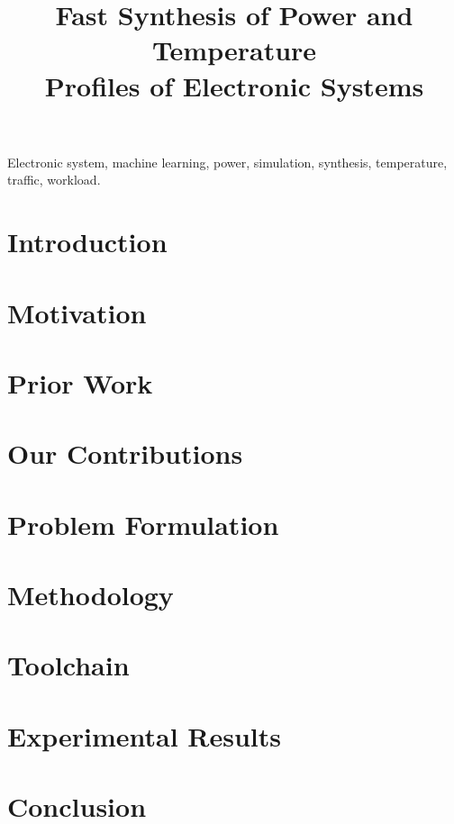 \documentclass[conference]{IEEEtran}
\title{
  Fast Synthesis of Power and Temperature\\
  Profiles of Electronic Systems
  \vspace{-1.5em}
}
\author{}
\begin{document}
  \maketitle

  \begin{abstract}
    
  \end{abstract}

  \begin{IEEEkeywords}
    Electronic system,
    machine learning,
    power,
    simulation,
    synthesis,
    temperature,
    traffic,
    workload.
  \end{IEEEkeywords}


  \section{Introduction} 
  

  \section{Motivation} 
  

  \section{Prior Work}

  
  \section{Our Contributions} 
  

  \section{Problem Formulation} 
  

  \section{Methodology} 
  

  \section{Toolchain} 
  

  \section{Experimental Results} 
  

  \section{Conclusion} 
  

  \begingroup
    \linespread{0.9}
    
    
  \endgroup
\end{document}
